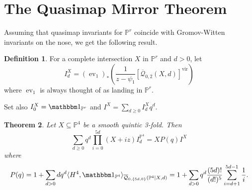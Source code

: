 \documentclass[11pt]{amsart}
\newcommand{\Q}[4]{\overline{\mathcal Q}_{#1,#2}(#3,#4)}
\newcommand{\PP}{\mathbb P}
\newcommand{\ev}{\operatorname{ev}}
\theoremstyle{plain}
\newtheorem{thm}{Theorem}[section]
\theoremstyle{definition}
\newtheorem{dfn}[thm]{Definition}
\begin{document}
\newpage

\section{The Quasimap Mirror Theorem}
Assuming that quasimap invariants for $\PP^r$ coincide with Gromov-Witten invariants on the nose, we get the following result.
\begin{dfn}
 For a complete intersection $X$ in $\PP^r$ and $d>0$, let
 \[
  I^X_d=(\ev_1)_*\left(\frac{1}{z-\psi_1}[\Q{0}{2}{X}{d}]^\text{vir}\right)
 \]
 where $\ev_1$ is always thought of as landing in $\PP^r$.
 
 Set also $I^X_0=\mathbbm 1_{\PP^r}$ and $I^X=\sum_{d\geq 0}I^X_d q^d$.
\end{dfn}
\begin{thm}
Let $X\subseteq\PP^4$ be a smooth quintic 3-fold. Then
 \[
  \sum_{d\geq 0} q^d\prod_{i=0}^{5d}(X+iz)I^{\PP^4}_d= XP(q)I^X
 \]
where
\[
 P(q)=1+\sum_{d>0}dq^d\langle H^4,\mathbbm 1_{\PP^4}\rangle_{\Q{0}{\{5d,0\}}{\PP^4|X}{d}}=1+\sum_{d>0}q^d\frac{(5d)!}{(d!)^5}\sum_{i=d+1}^{5d-1}\frac{1}{i}.
\]
\end{thm}
\end{document}
